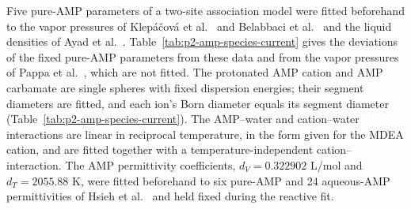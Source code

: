 

Five pure-AMP parameters of a two-site association model were fitted beforehand to the vapor pressures of Klep\'a\v{c}ov\'a et al.\ \cite[Table~10]{klepacovaVaporPressuresSeveral2011} and Belabbaci et al.\ \cite[Table~2]{belabbaciInvestigationIsothermalVapour2010} and the liquid densities of Ayad et al.\ \cite[Table~2]{ayadMeasurementsModelingThermodynamic2023}.
Table~\ref{tab:p2-amp-species-current} gives the deviations of the fixed pure-AMP parameters from these data and from the vapor pressures of Pappa et al.\ \cite[Table~1]{pappaMeasurementThermodynamicModeling2006}, which are not fitted.
The protonated AMP cation and AMP carbamate are single spheres with fixed dispersion energies; their segment diameters are fitted, and each ion's Born diameter equals its segment diameter (Table~\ref{tab:p2-amp-species-current}).
The AMP--water and cation--water interactions are linear in reciprocal temperature, in the form given for the MDEA cation, and are fitted together with a temperature-independent cation--\COtwo interaction.
The AMP permittivity coefficients, $d_V=0.322902$ L/mol and $d_T=2055.88$ K, were fitted beforehand to six pure-AMP and 24 aqueous-AMP permittivities of Hsieh et al.\ \cite[Tables~2 and 5]{hsiehDielectricConstantsAqueous2007} and held fixed during the reactive fit.



